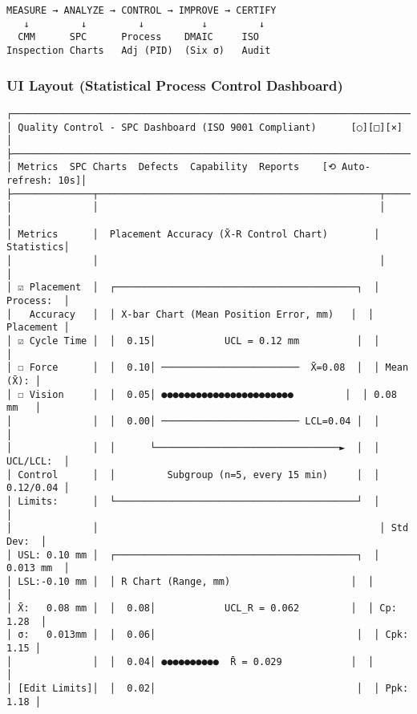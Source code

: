 \documentclass[
]{article}
\begin{document}
\begin{verbatim}
MEASURE → ANALYZE → CONTROL → IMPROVE → CERTIFY
   ↓         ↓         ↓          ↓         ↓
  CMM      SPC      Process    DMAIC     ISO
Inspection Charts   Adj (PID)  (Six σ)   Audit
\end{verbatim}

\hypertarget{ui-layout-statistical-process-control-dashboard}{%
\subsubsection{UI Layout (Statistical Process Control
Dashboard)}\label{ui-layout-statistical-process-control-dashboard}}

\begin{verbatim}
┌────────────────────────────────────────────────────────────────────────────┐
│ Quality Control - SPC Dashboard (ISO 9001 Compliant)      [○][□][×]        │
├────────────────────────────────────────────────────────────────────────────┤
│ Metrics  SPC Charts  Defects  Capability  Reports    [⟲ Auto-refresh: 10s]│
├──────────────┬─────────────────────────────────────────────────┬───────────┤
│              │                                                 │           │
│ Metrics      │  Placement Accuracy (X̄-R Control Chart)        │ Statistics│
│              │                                                 │           │
│ ☑ Placement  │  ┌──────────────────────────────────────────┐  │ Process:  │
│   Accuracy   │  │ X-bar Chart (Mean Position Error, mm)   │  │ Placement │
│ ☑ Cycle Time │  │  0.15│            UCL = 0.12 mm          │  │           │
│ ☐ Force      │  │  0.10│ ────────────────────────  X̄=0.08  │  │ Mean (X̄): │
│ ☐ Vision     │  │  0.05│ ●●●●●●●●●●●●●●●●●●●●●●●         │  │ 0.08 mm   │
│              │  │  0.00│ ──────────────────────── LCL=0.04 │  │           │
│              │  │      └────────────────────────────────►  │  │ UCL/LCL:  │
│ Control      │  │         Subgroup (n=5, every 15 min)     │  │ 0.12/0.04 │
│ Limits:      │  └──────────────────────────────────────────┘  │           │
│              │                                                 │ Std Dev:  │
│ USL: 0.10 mm │  ┌──────────────────────────────────────────┐  │ 0.013 mm  │
│ LSL:-0.10 mm │  │ R Chart (Range, mm)                     │  │           │
│ X̄:   0.08 mm │  │  0.08│            UCL_R = 0.062         │  │ Cp: 1.28  │
│ σ:   0.013mm │  │  0.06│                                   │  │ Cpk: 1.15 │
│              │  │  0.04│ ●●●●●●●●●●  R̄ = 0.029            │  │           │
│ [Edit Limits]│  │  0.02│                                   │  │ Ppk: 1.18 │

\end{verbatim}
\end{document}
